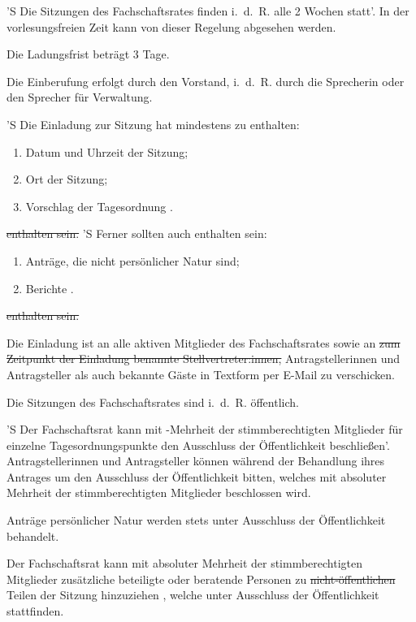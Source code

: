 \documentclass[%
	parskip=half,
]{scrartcl}
\newcounter{enumitem}
\newcommand{\edit}[1]{{\color{red} #1}}
\newcommand{\add}[1]{{\color{blue} #1}}
\newcommand{\new}[1]{{\color{orange} #1}}
\newcommand{\delete}[1]{{\color{red} \sout{#1}}}
\begin{document}
\begin{contract}

 \label{einberufung}

'S Die Sitzungen des Fachschaftsrates finden i.~d.~R. alle 2 Wochen statt'. In der vorlesungsfreien Zeit kann von 
dieser Regelung abgesehen werden.

Die Ladungsfrist beträgt 3 Tage.

Die Einberufung erfolgt durch den Vorstand, i.~d.~R. durch \edit{die Sprecherin oder den Sprecher} für Verwaltung.

'S Die Einladung zur Sitzung hat mindestens \add{zu enthalten}:
\begin{enumerate}[\qquad a)]
	\item Datum und \edit{Uhrzeit} der Sitzung;
	\item Ort der Sitzung;
	\item Vorschlag der Tagesordnung\edit{.}
	\setcounter{enumitem}{\value{enumi}}
\end{enumerate}
\delete{enthalten sein.}
'S Ferner sollten auch \add{enthalten sein}:
\begin{enumerate}[\qquad a)]
	\setcounter{enumi}{\value{enumitem}}
	\item Anträge, die nicht persönlicher Natur sind;
	\item Berichte\edit{.}
\end{enumerate}
\delete{enthalten sein.}

Die Einladung ist an alle \new{aktiven} Mitglieder des Fachschaftsrates sowie an \delete{zum Zeitpunkt der Einladung
benannte Stellvertreter:innen,} \edit{Antragstellerinnen und Antragsteller als auch} bekannte Gäste in Textform per
E-Mail zu verschicken.


Die Sitzungen des Fachschaftsrates sind i.~d.~R. öffentlich.

'S Der Fachschaftsrat kann mit -Mehrheit der stimmberechtigten Mitglieder für einzelne 
Tagesordnungspunkte den Ausschluss der Öffentlichkeit beschließen'. \edit{Antragstellerinnen und Antragsteller können 
während der Behandlung ihres Antrages um den Ausschluss der Öffentlichkeit bitten, welches mit absoluter Mehrheit der 
stimmberechtigten Mitglieder beschlossen wird.}

Anträge persönlicher Natur werden stets \edit{unter Ausschluss der Öffentlichkeit} behandelt.

Der Fachschaftsrat kann mit absoluter Mehrheit der stimmberechtigten Mitglieder zusätzliche beteiligte oder beratende 
Personen zu \delete{nicht-öffentlichen} Teilen der Sitzung hinzuziehen\add{, welche unter Ausschluss der Öffentlichkeit 
stattfinden}.


\end{contract}
\end{document}
